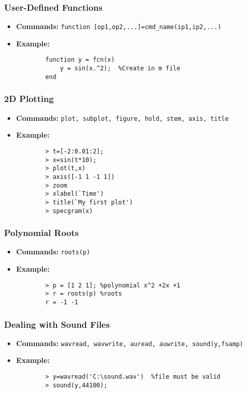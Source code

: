 \documentclass[a4paper,11pt]{article}
\begin{document}
\subsubsection{User-Defined Functions}
\begin{itemize}
    \item \textbf{Commands:} \texttt{function [op1,op2,...]=cmd\_name(ip1,ip2,...)}
    \item \textbf{Example:}
          \begin{verbatim}
        function y = fcn(x)
            y = sin(x.^2);  %Create in m file
        end
\end{verbatim}
\end{itemize}

\subsubsection{2D Plotting}
\begin{itemize}
    \item \textbf{Commands:} \texttt{plot, subplot, figure, hold, stem, axis, title}
    \item \textbf{Example:}
          \begin{verbatim}
        > t=[-2:0.01:2];
        > x=sin(t*10);
        > plot(t,x)
        > axis([-1 1 -1 1])
        > zoom
        > xlabel(`Time')
        > title(`My first plot')
        > specgram(x)
\end{verbatim}
\end{itemize}

\subsubsection{Polynomial Roots}
\begin{itemize}
    \item \textbf{Commands:} \texttt{roots(p)}
    \item \textbf{Example:}
          \begin{verbatim}
        > p = [1 2 1]; %polynomial x^2 +2x +1
        > r = roots(p) %roots
        r = -1 -1
\end{verbatim}
\end{itemize}

\subsubsection{Dealing with Sound Files}
\begin{itemize}
    \item \textbf{Commands:} \texttt{wavread, wavwrite, auread, auwrite, sound(y,fsamp)}
    \item \textbf{Example:}
          \begin{verbatim}
        > y=wavread('C:\sound.wav')  %file must be valid
        > sound(y,44100);
\end{verbatim}
\end{itemize}
\end{document}
